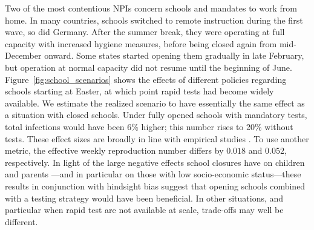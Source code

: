 Two of the most contentious NPIs concern schools and mandates to work from
home. In many countries, schools switched to remote instruction
during the first wave, so did Germany. After the summer break, they were operating at
full capacity with increased hygiene measures, before being closed again from
mid-December onward. Some states started opening them gradually in late February, but
operation at normal capacity did not resume until the beginning of June.
Figure~\ref{fig:school_scenarios} shows the effects of different policies regarding
schools starting at Easter, at which point rapid tests had become widely available. We
estimate the realized scenario to have essentially the same effect as a situation with
closed schools. Under fully opened schools with mandatory tests, total infections would
have been 6\% higher; this number rises to 20\% without tests. These effect sizes are
broadly in line with empirical studies \citep[e.g.,][]{Vlachos2021}.  To use another metric, the effective weekly
reproduction number differs by $0.018$ and $0.052$, respectively. In light of the large
negative effects school closures have on children and parents \citep{Luijten2021,
Melegari2021}---and in particular on those with low socio-economic status---these results
in conjunction with hindsight bias suggest that opening schools combined with a testing
strategy would have been beneficial. In other situations, and particular when rapid test
are not available at scale, trade-offs may well be different.

